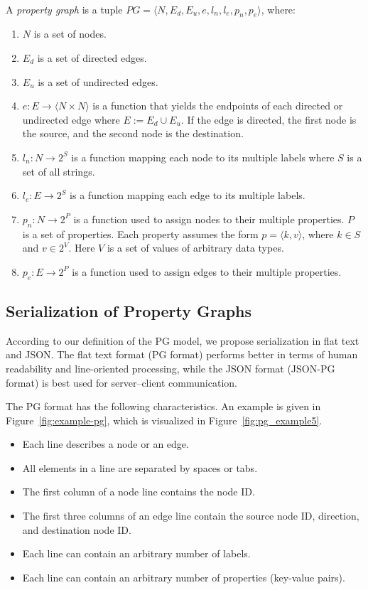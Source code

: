 \documentclass[runningheads]{llncs}
\begin{document}
\begin{defi}
\leavevmode \vspace{1mm} \\
A \emph{property graph} is a tuple
$PG = \langle N, E_d, E_u, e, l_n, l_e, p_n, p_e\rangle$, where:
\begin{enumerate}
    \item $N$ is a set of nodes.
    \item $E_d$ is a set of directed edges.
    \item $E_u$ is a set of undirected edges.
    \item $e: E \to \langle N \times N \rangle$ is a function that yields the endpoints of each directed or undirected edge where $E := E_d \cup E_u$. If the edge is directed, the first node is the source, and the second node is the destination.
    \item $l_n : N \to 2^S$ is a function mapping each node to its multiple labels where $S$ is a set of all strings.
    \item $l_e : E \to 2^S$ is a function mapping each edge to its multiple labels.
    \item $p_n : N \to 2^P$ is a function used to assign nodes to their multiple properties. $P$ is a set of properties. Each property assumes the form $p = \langle k,v \rangle$, where $k \in S$ and $v \in 2^V$. Here $V$ is a set of values of arbitrary data types.
    \item $p_e : E \to 2^P$ is a function used to assign edges to their multiple properties.
\end{enumerate}
\end{defi}


\subsection{Serialization of Property Graphs}
According to our definition of the PG model, we propose serialization in flat text and JSON. The flat text format (PG format) performs better in terms of human readability and line-oriented processing, while the JSON format (JSON-PG format) is best used for server--client communication.

The PG format has the following characteristics. An example is given in Figure~\ref{fig:example-pg}, which is visualized in Figure~\ref{fig:pg_example5}.

\begin{itemize}
    \item Each line describes a node or an edge.
    \item All elements in a line are separated by spaces or tabs.
    \item The first column of a node line contains the node ID.
    \item The first three columns of an edge line contain the source node ID, direction, and destination node ID.
    \item Each line can contain an arbitrary number of labels.
    \item Each line can contain an arbitrary number of properties (key-value pairs).
\end{itemize}
\end{document}
